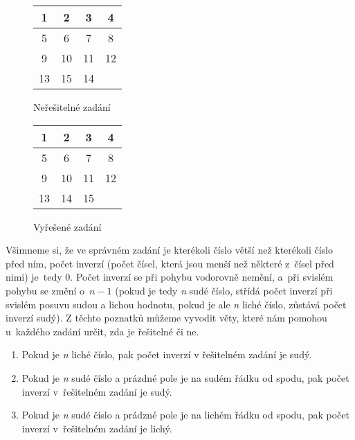 \documentclass[12pt,titlepage]{article}
\begin{document}
\begin{figure}[h]
\begin{minipage}{.5\textwidth}
\begin{center}
\begin{tabular}{|c|c|c|c|}
\hline
1 & 2 & 3 & 4\\
\hline
5 & 6 & 7 & 8\\
\hline
9 & 10 & 11 & 12\\
\hline
13 & 15 & 14 &  \\
\hline
\end{tabular}
\end{center}
\caption{Neřešitelné zadání}
\label{pokus}
\end{minipage}\hfill
\begin{minipage}{.4\textwidth}
\begin{center}
\begin{tabular}{|c|c|c|c|}
\hline
1 & 2 & 3 & 4\\
\hline
5 & 6 & 7 & 8\\
\hline
9 & 10 & 11 & 12\\
\hline
13 & 14 & 15 & \\
\hline
\end{tabular}
\end{center}
\caption{Vyřešené zadání}
\label{nepokus}
\end{minipage}

\end{figure}

Všimneme si, že ve správném zadání je kterékoli číslo větší než kterékoli číslo před ním, počet inverzí (počet čísel, která jsou menší než některé z~čísel před nimi) je~tedy 0. Počet inverzí se při pohybu vodorovně nemění, a~při svislém pohybu se změní o~$n-1$ (pokud je tedy \textit{n} sudé číslo, střídá počet inverzí při svislém posuvu sudou a lichou hodnotu, pokud je ale \textit{n} liché číslo, zůstává počet inverzí sudý). Z těchto poznatků můžeme vyvodit věty, které nám pomohou u~každého zadání určit, zda je řešitelné či ne.

\begin{enumerate}
\item Pokud je \textit{n} liché číslo, pak počet inverzí v řešitelném zadání je sudý.
\item Pokud je \textit{n} sudé číslo a prázdné pole je na sudém řádku od spodu, pak počet inverzí v~řešitelném zadání je sudý.
\item Pokud je \textit{n} sudé číslo a prádzné pole je na lichém řádku od spodu, pak počet inverzí v~řešitelném zadání je lichý.
\end{enumerate}
\end{document}
